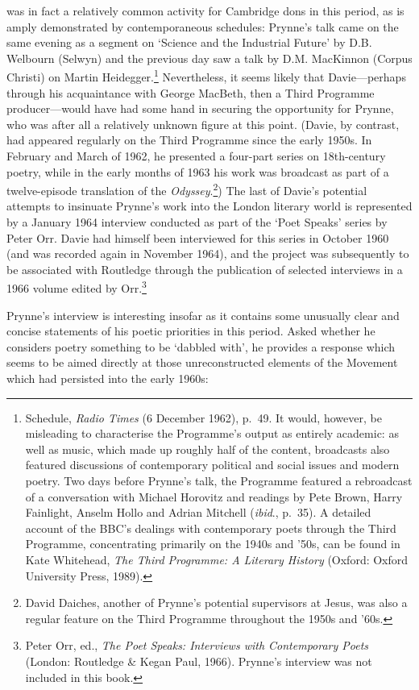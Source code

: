 \documentclass[]{article}
\begin{document}
was in fact a relatively common activity for Cambridge dons in this
period, as is amply demonstrated by contemporaneous schedules: Prynne's
talk came on the same evening as a segment on `Science and the
Industrial Future' by D.B. Welbourn (Selwyn) and the previous day saw a
talk by D.M. MacKinnon (Corpus Christi) on Martin Heidegger.\footnote{Schedule,
  \emph{Radio Times} (6 December 1962), p.~49. It would, however, be
  misleading to characterise the Programme's output as entirely
  academic: as well as music, which made up roughly half of the content,
  broadcasts also featured discussions of contemporary political and
  social issues and modern poetry. Two days before Prynne's talk, the
  Programme featured a rebroadcast of a conversation with Michael
  Horovitz and readings by Pete Brown, Harry Fainlight, Anselm Hollo and
  Adrian Mitchell (\emph{ibid}., p.~35). A detailed account of the BBC's
  dealings with contemporary poets through the Third Programme,
  concentrating primarily on the 1940s and '50s, can be found in Kate
  Whitehead, \emph{The Third Programme: A Literary History} (Oxford:
  Oxford University Press, 1989).} Nevertheless, it seems likely that
Davie---perhaps through his acquaintance with George MacBeth, then a
Third Programme producer---would have had some hand in securing the
opportunity for Prynne, who was after all a relatively unknown figure at
this point. (Davie, by contrast, had appeared regularly on the Third
Programme since the early 1950s. In February and March of 1962, he
presented a four-part series on 18th-century poetry, while in the early
months of 1963 his work was broadcast as part of a twelve-episode
translation of the \emph{Odyssey}.\footnote{David Daiches, another of
  Prynne's potential supervisors at Jesus, was also a regular feature on
  the Third Programme throughout the 1950s and '60s.}) The last of
Davie's potential attempts to insinuate Prynne's work into the London
literary world is represented by a January 1964 interview conducted as
part of the `Poet Speaks' series by Peter Orr. Davie had himself been
interviewed for this series in October 1960 (and was recorded again in
November 1964), and the project was subsequently to be associated with
Routledge through the publication of selected interviews in a 1966
volume edited by Orr.\footnote{Peter Orr, ed., \emph{The Poet Speaks:
  Interviews with Contemporary Poets} (London: Routledge \& Kegan Paul,
  1966). Prynne's interview was not included in this book.}

Prynne's interview is interesting insofar as it contains some unusually
clear and concise statements of his poetic priorities in this period.
Asked whether he considers poetry something to be `dabbled with', he
provides a response which seems to be aimed directly at those
unreconstructed elements of the Movement which had persisted into the
early 1960s:
\end{document}
